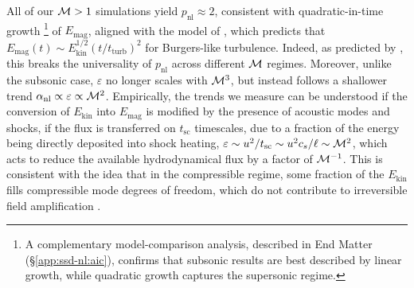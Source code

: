     \clearpage
    All of our $\mathcal{M} > 1$ simulations yield $p_\mathrm{nl} \approx 2$, consistent with quadratic-in-time growth \footnote{A complementary model-comparison analysis, described in End Matter (\S\ref{app:ssd-nl:aic}), confirms that subsonic results are best described by linear growth, while quadratic growth captures the supersonic regime.} of $E_\mathrm{mag}$, aligned with the model of \citet{schleicher2013small}, which predicts that $E_\mathrm{mag}(t) \sim E_\mathrm{kin}^{1/2} (t/t_\mathrm{turb})^2$ for Burgers-like turbulence. Indeed, as predicted by \citet{schleicher2013small}, this breaks the universality of $p_\mathrm{nl}$ across different $\mathcal{M}$ regimes. Moreover, unlike the subsonic case, $\varepsilon$ no longer scales with $\mathcal{M}^3$, but instead follows a shallower trend $\alpha_\mathrm{nl} \propto \varepsilon \propto \mathcal{M}^2$. Empirically, the trends we measure can be understood if the conversion of $E_{\mathrm{kin}}$ into $E_{\mathrm{mag}}$ is modified by the presence of acoustic modes and shocks, \ie if the flux is transferred on $t_\mathrm{sc}$ timescales, due to a fraction of the energy being directly deposited into shock heating, $\varepsilon \sim u^2/t_{\mathrm{sc}} \sim u^2 c_s / \ell \sim \mathcal{M}^2$, which acts to reduce the available hydrodynamical flux by a factor of $\mathcal{M}^{-1}$. This is consistent with the idea that in the compressible regime, some fraction of the $E_{\mathrm{kin}}$ fills compressible mode degrees of freedom, which do not contribute to irreversible field amplification \citep{Federrath2011_supersonic_dynamo, Federrath2014_supersonic_dynamo, seta2021saturation, sur2024role, beattie2025taking}.

